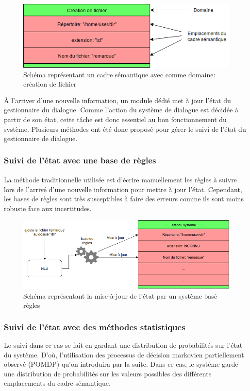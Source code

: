 		\begin{figure}[H]
			\centering
			\includegraphics[width=.7\linewidth]{images/DM/SFrame.png} 
			\caption{Schéma représentant un cadre sémantique avec comme domaine: création de fichier} 
			\label{SFrame}
		\end{figure}


À l’arriver d’une nouvelle information, un module dédié met à jour l’état du gestionnaire du dialogue. Comme l’action du système de dialogue est décidée à partir de son état, cette tâche est donc essentiel au bon fonctionnement du système. Plusieurs méthodes ont été donc proposé pour gérer le suivi de l’état du gestionnaire de dialogue.
\subsubsection{Suivi de l’état avec une base de règles}
\paragraph{}
La méthode traditionnelle utilisée est d’écrire manuellement les règles à suivre lors de l’arrivé d’une nouvelle information pour mettre à jour l’état\cite{Goddeau1996}. Cependant, les bases de règles sont très susceptibles à faire des erreurs\cite{Chen2017} comme ils sont moins robuste face aux incertitudes.


\begin{figure}[H]
	\centering
	\includegraphics[width=.7\linewidth]{images/DM/RuleBasedUpdate.png} 
	\caption{Schéma représentant la mise-à-jour de l'état par un système basé règles} 
\end{figure}

\subsubsection{Suivi de l’état avec des méthodes statistiques}
Le suivi dans ce cas se fait en gardant une distribution de probabilités sur l’état du système. D’où, l’utilisation des processus de décision markovien partiellement observé (POMDP)\cite{Young2010} qu’on introduira par la suite. Dans ce cas, le système garde une distribution de probabilités sur les valeurs possibles des différents emplacements du cadre sémantique.

